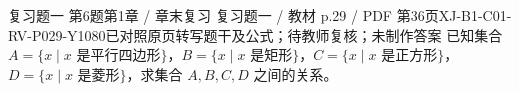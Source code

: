 \par\noindent\begin{minipage}{\linewidth}
\begin{bankitem}{复习题一 第6题}{第1章 / 章末复习 复习题一 / 教材 p.29 / PDF 第36页}{XJ-B1-C01-RV-P029-Y1080}{已对照原页转写题干及公式；待教师复核；未制作答案}
已知集合 $A=\{x\mid x\text{ 是平行四边形}\}$，$B=\{x\mid x\text{ 是矩形}\}$，$C=\{x\mid x\text{ 是正方形}\}$，$D=\{x\mid x\text{ 是菱形}\}$，求集合 $A,B,C,D$ 之间的关系。
\end{bankitem}
\end{minipage}\par\medskip
